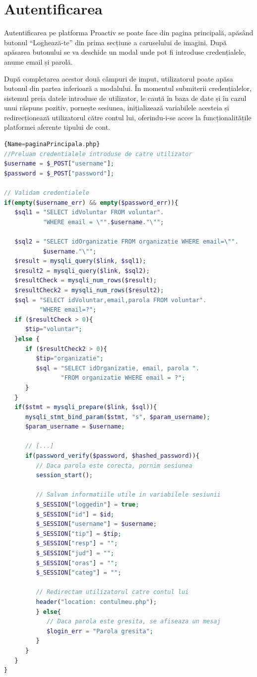 \documentclass[12pt,a4paper]{report}
\begin{document}
\section{Autentificarea}
\par
Autentificarea pe platforma Proactiv se poate face din pagina principală, apăsând butonul  “Loghează-te” din prima secțiune a caruselului de imagini. După apăsarea butonului se va deschide un modal unde pot fi introduse credențialele, anume email și parolă.
\\
\par
După completarea acestor două câmpuri de imput, utilizatorul poate apăsa butonul din partea inferioară a modalului. În momentul submiterii credențialelor, sistemul preia datele introduse de utilizator, le caută în baza de date și în cazul unui răspuns pozitiv, pornește sesiunea, inițializează variabilele acesteia și redirecționează utilizatorul către contul lui, oferindu-i-se acces la funcționalitățile platformei aferente tipului de cont.
\\
\begin{lstlisting}[basicstyle=\small, language=PHP,caption=Secțiune de cod PHP responsabilă de autentificare]{Name=paginaPrincipala.php}
//Preluam credentialele introduse de catre utilizator
$username = $_POST["username"];
$password = $_POST["password"];

// Validam credentialele
if(empty($username_err) && empty($password_err)){
   $sql1 = "SELECT idVoluntar FROM voluntar". 
           "WHERE email = \"".$username."\"";

   $sql2 = "SELECT idOrganizatie FROM organizatie WHERE email=\"".
           $username."\"";
   $result = mysqli_query($link, $sql1);
   $result2 = mysqli_query($link, $sql2);
   $resultCheck = mysqli_num_rows($result);
   $resultCheck2 = mysqli_num_rows($result2);
   $sql = "SELECT idVoluntar,email,parola FROM voluntar".
          "WHERE email=?";
   if ($resultCheck > 0){
      $tip="voluntar";
   }else {
      if ($resultCheck2 > 0){
         $tip="organizatie";
         $sql = "SELECT idOrganizatie, email, parola ".
                "FROM organizatie WHERE email = ?";
      }
   }
   if($stmt = mysqli_prepare($link, $sql)){
      mysqli_stmt_bind_param($stmt, "s", $param_username);
      $param_username = $username;
      
      // [...]
      if(password_verify($password, $hashed_password)){
         // Daca parola este corecta, pornim sesiunea
         session_start();

         // Salvam informatiile utile in variabilele sesiunii
         $_SESSION["loggedin"] = true;
         $_SESSION["id"] = $id;
         $_SESSION["username"] = $username;
         $_SESSION["tip"] = $tip;
         $_SESSION["resp"] = "";
         $_SESSION["jud"] = "";
         $_SESSION["oras"] = "";
         $_SESSION["categ"] = "";

         // Redirectam utilizatorul catre contul lui
         header("location: contulmeu.php");
         } else{
            // Daca parola este gresita, se afiseaza un mesaj
            $login_err = "Parola gresita";
         }
      }
   }
}
\end{lstlisting}
\end{document}
